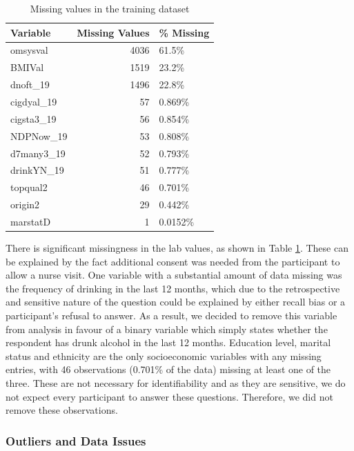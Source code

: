 \documentclass[
  11pt,
  twocolumn]{article}
\begin{document}
\begin{table}

\caption{\label{tab:outputnatable}Missing values in the training dataset\label{tab:output-na-table}}
\centering
\fontsize{9}{11}\selectfont
\begin{tabular}[t]{l|r|l}
\hline
\textbf{Variable} & \textbf{Missing Values} & \textbf{\% Missing}\\
\hline
omsysval & 4036 & 61.5\%\\
\hline
BMIVal & 1519 & 23.2\%\\
\hline
dnoft\_19 & 1496 & 22.8\%\\
\hline
cigdyal\_19 & 57 & 0.869\%\\
\hline
cigsta3\_19 & 56 & 0.854\%\\
\hline
NDPNow\_19 & 53 & 0.808\%\\
\hline
d7many3\_19 & 52 & 0.793\%\\
\hline
drinkYN\_19 & 51 & 0.777\%\\
\hline
topqual2 & 46 & 0.701\%\\
\hline
origin2 & 29 & 0.442\%\\
\hline
marstatD & 1 & 0.0152\%\\
\hline
\end{tabular}
\end{table}

There is significant missingness in the lab values, as shown in Table
\ref{tab:output-na-table}. These can be explained by the fact additional
consent was needed from the participant to allow a nurse visit. One
variable with a substantial amount of data missing was the frequency of
drinking in the last 12 months, which due to the retrospective and
sensitive nature of the question could be explained by either recall
bias or a participant's refusal to answer. As a result, we decided to
remove this variable from analysis in favour of a binary variable which
simply states whether the respondent has drunk alcohol in the last 12
months. Education level, marital status and ethnicity are the only
socioeconomic variables with any missing entries, with 46 observations
(0.701\% of the data) missing at least one of the three. These are not
necessary for identifiability and as they are sensitive, we do not
expect every participant to answer these questions. Therefore, we did
not remove these observations.

\hypertarget{outliers-and-data-issues}{%
\subsubsection{Outliers and Data
Issues}\label{outliers-and-data-issues}}
\end{document}

